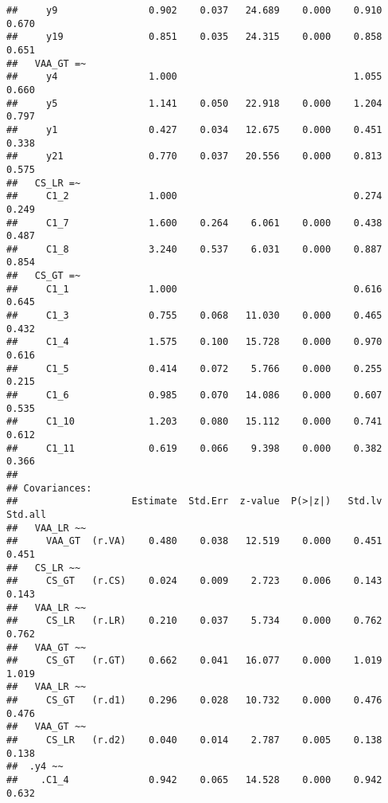 \documentclass[
]{article}
\begin{document}
\begin{verbatim}
##     y9                0.902    0.037   24.689    0.000    0.910    0.670
##     y19               0.851    0.035   24.315    0.000    0.858    0.651
##   VAA_GT =~                                                             
##     y4                1.000                               1.055    0.660
##     y5                1.141    0.050   22.918    0.000    1.204    0.797
##     y1                0.427    0.034   12.675    0.000    0.451    0.338
##     y21               0.770    0.037   20.556    0.000    0.813    0.575
##   CS_LR =~                                                              
##     C1_2              1.000                               0.274    0.249
##     C1_7              1.600    0.264    6.061    0.000    0.438    0.487
##     C1_8              3.240    0.537    6.031    0.000    0.887    0.854
##   CS_GT =~                                                              
##     C1_1              1.000                               0.616    0.645
##     C1_3              0.755    0.068   11.030    0.000    0.465    0.432
##     C1_4              1.575    0.100   15.728    0.000    0.970    0.616
##     C1_5              0.414    0.072    5.766    0.000    0.255    0.215
##     C1_6              0.985    0.070   14.086    0.000    0.607    0.535
##     C1_10             1.203    0.080   15.112    0.000    0.741    0.612
##     C1_11             0.619    0.066    9.398    0.000    0.382    0.366
## 
## Covariances:
##                    Estimate  Std.Err  z-value  P(>|z|)   Std.lv  Std.all
##   VAA_LR ~~                                                             
##     VAA_GT  (r.VA)    0.480    0.038   12.519    0.000    0.451    0.451
##   CS_LR ~~                                                              
##     CS_GT   (r.CS)    0.024    0.009    2.723    0.006    0.143    0.143
##   VAA_LR ~~                                                             
##     CS_LR   (r.LR)    0.210    0.037    5.734    0.000    0.762    0.762
##   VAA_GT ~~                                                             
##     CS_GT   (r.GT)    0.662    0.041   16.077    0.000    1.019    1.019
##   VAA_LR ~~                                                             
##     CS_GT   (r.d1)    0.296    0.028   10.732    0.000    0.476    0.476
##   VAA_GT ~~                                                             
##     CS_LR   (r.d2)    0.040    0.014    2.787    0.005    0.138    0.138
##  .y4 ~~                                                                 
##    .C1_4              0.942    0.065   14.528    0.000    0.942    0.632

\end{verbatim}
\end{document}

